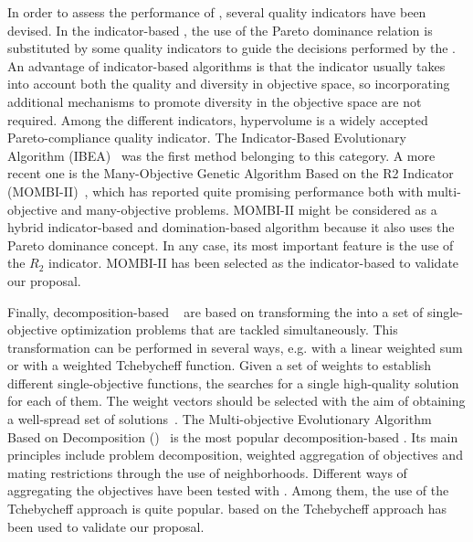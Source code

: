 In order to assess the performance of \MOEAS{}, several quality indicators have been devised.
%
In the indicator-based \MOEAS{}, the use of the Pareto dominance relation is substituted by some quality indicators to guide the decisions 
performed by the \MOEA{}.
%
An advantage of indicator-based algorithms is that the indicator usually takes into account both the quality and diversity in objective space, so incorporating additional mechanisms
to promote diversity in the objective space are not required.
%
Among the different indicators, hypervolume is a widely accepted Pareto-compliance quality indicator.
%
The Indicator-Based Evolutionary Algorithm (IBEA)~\cite{Joel:IBEA} was the first method belonging to this category.
%
A more recent one is the Many-Objective Genetic Algorithm Based on the R2 Indicator (MOMBI-II)~\cite{Joel:MOMBI-II}, which has reported quite promising performance both with multi-objective and 
many-objective problems.
%
MOMBI-II might be considered as a hybrid indicator-based and domination-based algorithm because it also uses the Pareto dominance concept. 
%
In any case, its most important feature is the use of the $R_2$ indicator. %
%
MOMBI-II has been selected as the indicator-based \MOEA{} to validate our proposal.

Finally, decomposition-based \MOEAS{}~\cite{Joel:MOEAD_AMS} are based on transforming the \MOP{} into a set of single-objective optimization problems that are tackled simultaneously.
%
This transformation can be performed in several ways, e.g. with a linear weighted sum or with a weighted Tchebycheff function. 
%
Given a set of weights to establish different single-objective functions, the \MOEA{} searches for a single high-quality solution for each of them. 
%
The weight vectors should be selected with the aim of obtaining a well-spread set of solutions~\cite{Joel:Kalyanmoy}.
%
%
The Multi-objective Evolutionary Algorithm Based on Decomposition (\MOEAD{})~\cite{Joel:MOEAD} is the most popular decomposition-based \MOEA{}. 
%
Its main principles include problem decomposition, weighted aggregation of objectives and mating restrictions through the use of neighborhoods. 
%
Different ways of aggregating the objectives have been tested with \MOEAD{}.
%
Among them, the use of the Tchebycheff approach is quite popular. 
%
\MOEAD{} based on the Tchebycheff approach has been used to validate our proposal.
 
